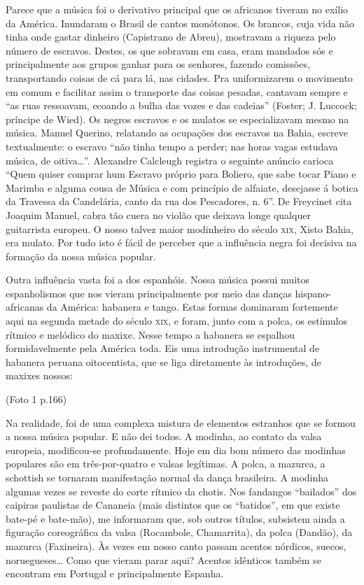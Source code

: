 Parece que a música foi o derivativo principal que os africanos tiveram
no exílio da América. Inundaram o Brasil de cantos monótonos. Os
brancos, cuja vida não tinha onde gastar dinheiro (Capistrano de Abreu),
mostravam a riqueza pelo número de escravos. Destes, os que sobravam em
casa, eram mandados sós e principalmente aos grupos ganhar para os
senhores, fazendo comissões, transportando coisas de cá para lá, nas
cidades. Pra uniformizarem o movimento em comum e facilitar assim o
transporte das coisas pesadas, cantavam sempre e ``as ruas ressoavam,
ecoando a bulha das vozes e das cadeias'' (Foster; J. Luccock; príncipe
de Wied). Os negros escravos e os mulatos se especializavam mesmo na
música. Manuel Querino, relatando as ocupações dos escravos na Bahia,
escreve textualmente: o escravo ``não tinha tempo a perder; nas horas
vagas estudava música, de oitiva\ldots{}''. Alexandre Calcleugh registra o
seguinte anúncio carioca ``Quem quiser comprar hum Escravo próprio para
Boliero, que sabe tocar Piano e Marimba e alguma cousa de Música e com
princípio de alfaiate, desejasse á botica da Travessa da Candelária,
canto da rua dos Pescadores, n. 6''. De Freycinet cita Joaquim Manuel,
cabra tão cuera no violão que deixava longe qualquer guitarrista
europeu. O nosso talvez maior modinheiro do século \textsc{xix}, Xisto Bahia, era
mulato. Por tudo isto é fácil de perceber que a influência negra foi
decisiva na formação da nossa música popular.

Outra influência vasta foi a dos espanhóis. Nossa música possui muitos
espanholismos que nos vieram principalmente por meio das danças
hispano-africanas da América: habanera e tango. Estas formas dominaram
fortemente aqui na segunda metade do século \textsc{xix}, e foram, junto com a
polca, os estímulos rítmico e melódico do maxixe. Nesse tempo a habanera
se espalhou formidavelmente pela América toda. Eis uma introdução
instrumental de habanera peruana oitocentista, que se liga diretamente
às introduções, de maxixes nossos:

(Foto 1 p.166)

Na realidade, foi de uma complexa mistura de elementos estranhos que se
formou a nossa música popular. E não dei todos. A modinha, ao contato da
valsa europeia, modificou-se profundamente. Hoje em dia bom número das
modinhas populares são em três-por-quatro e valsas legítimas. A polca, a
mazurca, a schottish se tornaram manifestação normal da dança
brasileira. A modinha algumas vezes se reveste do corte rítmico da
chotis. Nos fandangos ``bailados'' dos caipiras paulistas de Cananeia
(mais distintos que os ``batidos'', em que existe bate-pé e bate-mão),
me informaram que, sob outros títulos, subsistem ainda a figuração
coreográfica da valsa (Rocambole, Chamarrita), da polca (Dandão), da
mazurca (Faxineira). Às vezes em nosso canto passam acentos nórdicos,
suecos, noruegueses\ldots{} Como que vieram parar aqui? Acentos idênticos
também se encontram em Portugal e principalmente Espanha.

